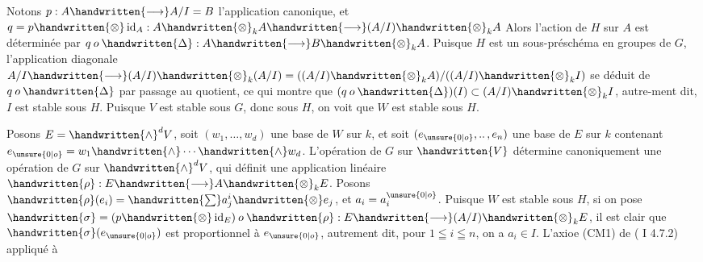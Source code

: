 Notons $p:A\handwritten{\longrightarrow}A/I=B$ l'application canonique, et $q=p\handwritten{\otimes}\operatorname{id}_A:A\handwritten{\otimes}_k A\handwritten{\longrightarrow}(A/I)\handwritten{\otimes}_k A$ Alors l'action de $H$ sur $A$ est déterminée par $q\mathbin{o}\handwritten{\Delta}:A\handwritten{\longrightarrow}B\handwritten{\otimes}_k A$. Puisque $H$ est un sous-préschéma en groupes de $G$, l'application diagonale $A/I\handwritten{\longrightarrow}(A/I)\handwritten{\otimes}_k(A/I)=((A/I)\handwritten{\otimes}_k A)/((A/I)\handwritten{\otimes}_k I)$ se déduit de $q\mathbin{o}\handwritten{\Delta}$ par passage au quotient, ce qui montre que $(q\mathbin{o}\handwritten{\Delta})(I)\subset(A/I)\handwritten{\otimes}_k I$, autre-\linebreak ment dit, $I$ est stable sous $H$. Puisque $V$ est stable sous $G$, donc sous $H$, on voit que $W$ est stable sous $H$.

Posons $E=\handwritten{\wedge}^d V$, soit $(w_1,\ldots,w_d)$ une base de $W$ sur $k$, et soit $(e_{\unsure{0|o}},\mathinner{..},e_n)$ une base de $E$ sur $k$ contenant $e_{\unsure{0|o}}=w_1\handwritten{\wedge}\cdots\handwritten{\wedge}w_d$. L'opération de $G$ sur $\handwritten{V}$ détermine canoniquement une opération de $G$ sur $\handwritten{\wedge}^d V$, qui définit une application linéaire $\handwritten{\rho}:E\handwritten{\longrightarrow}A\handwritten{\otimes}_k E$. Posons $\handwritten{\rho}(e_i)=\handwritten{\sum}a_j^i\handwritten{\otimes}e_j$, et $a_i=a_i^{\unsure{0|o}}$. Puisque $W$ est stable sous $H$, si on pose $\handwritten{\sigma}=(p\handwritten{\otimes}\operatorname{id}_E)\mathbin{o}\handwritten{\rho}:E\handwritten{\longrightarrow}(A/I)\handwritten{\otimes}_k E$, il est clair que $\handwritten{\sigma}(e_{\unsure{0|o}})$ est proportionnel à $e_{\unsure{0|o}}$, autrement dit, pour $1\leqq i\leqq n$, on a $a_i\in I$. L'axioe (CM1) de ( I 4.7.2) appliqué à
